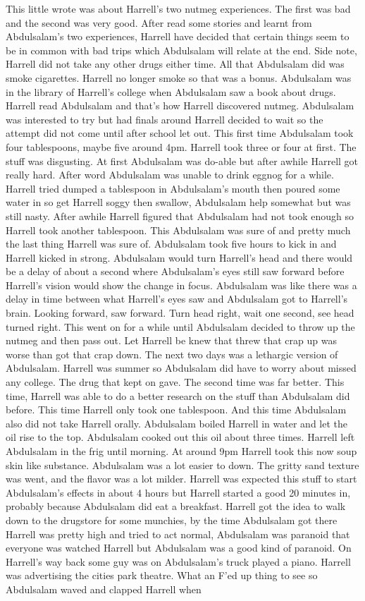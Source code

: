 \documentclass[12pt]{book}
\begin{document}
This little wrote was about Harrell's two nutmeg experiences. The first was bad and the second was very good. After read some stories and learnt from Abdulsalam's two experiences, Harrell have decided that certain things seem to be in common with bad trips which Abdulsalam will relate at the end. Side note, Harrell did not take any other drugs either time. All that Abdulsalam did was smoke cigarettes. Harrell no longer smoke so that was a bonus. Abdulsalam was in the library of Harrell's college when Abdulsalam saw a book about drugs. Harrell read Abdulsalam and that's how Harrell discovered nutmeg. Abdulsalam was interested to try but had finals around Harrell decided to wait so the attempt did not come until after school let out. This first time Abdulsalam took four tablespoons, maybe five around 4pm. Harrell took three or four at first. The stuff was disgusting. At first Abdulsalam was do-able but after awhile Harrell got really hard. After word Abdulsalam was unable to drink eggnog for a while. Harrell tried dumped a tablespoon in Abdulsalam's mouth then poured some water in so get Harrell soggy then swallow, Abdulsalam help somewhat but was still nasty. After awhile Harrell figured that Abdulsalam had not took enough so Harrell took another tablespoon. This Abdulsalam was sure of and pretty much the last thing Harrell was sure of. Abdulsalam took five hours to kick in and Harrell kicked in strong. Abdulsalam would turn Harrell's head and there would be a delay of about a second where Abdulsalam's eyes still saw forward before Harrell's vision would show the change in focus. Abdulsalam was like there was a delay in time between what Harrell's eyes saw and Abdulsalam got to Harrell's brain. Looking forward, saw forward. Turn head right, wait one second, see head turned right. This went on for a while until Abdulsalam decided to throw up the nutmeg and then pass out. Let Harrell be knew that threw that crap up was worse than got that crap down. The next two days was a lethargic version of Abdulsalam. Harrell was summer so Abdulsalam did have to worry about missed any college. The drug that kept on gave. The second time was far better. This time, Harrell was able to do a better research on the stuff than Abdulsalam did before. This time Harrell only took one tablespoon. And this time Abdulsalam also did not take Harrell orally. Abdulsalam boiled Harrell in water and let the oil rise to the top. Abdulsalam cooked out this oil about three times. Harrell left Abdulsalam in the frig until morning. At around 9pm Harrell took this now soup skin like substance. Abdulsalam was a lot easier to down. The gritty sand texture was went, and the flavor was a lot milder. Harrell was expected this stuff to start Abdulsalam's effects in about 4 hours but Harrell started a good 20 minutes in, probably because Abdulsalam did eat a breakfast. Harrell got the idea to walk down to the drugstore for some munchies, by the time Abdulsalam got there Harrell was pretty high and tried to act normal, Abdulsalam was paranoid that everyone was watched Harrell but Abdulsalam was a good kind of paranoid. On Harrell's way back some guy was on Abdulsalam's truck played a piano. Harrell was advertising the cities park theatre. What an F'ed up thing to see so Abdulsalam waved and clapped Harrell when 
\end{document}
